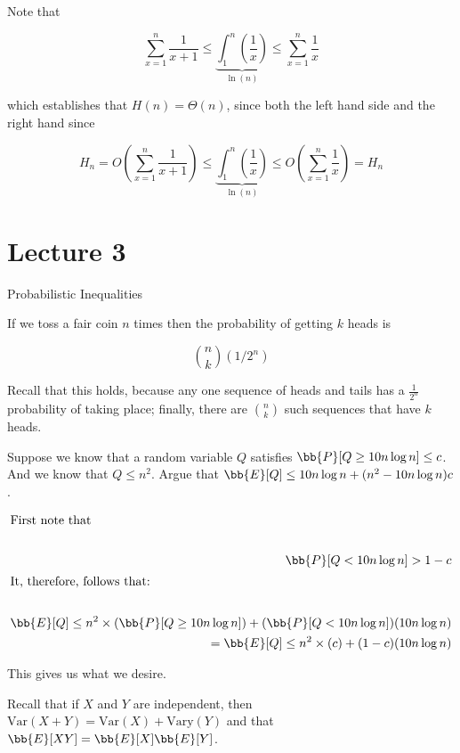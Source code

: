 \documentclass[../main.tex]{subfiles}
\begin{document}
Note that

\[
    \sum_{x=1}^{n}\frac{1}{x+1} \leq \underbrace{\int_{1}^{n}\left( \frac{1}{x} \right)}_{\ln(n)} \leq \sum_{x=1}^{n}\frac{1}{x}
\]

which establishes that $H(n) = \Theta(n)$, since both the left hand side and the right hand since


\[
    H_n = O(\sum_{x=1}^{n}\frac{1}{x+1}) \leq \underbrace{\int_{1}^{n}\left( \frac{1}{x} \right)}_{\ln(n)} \leq O(\sum_{x=1}^{n}\frac{1}{x}) = H_n
\]

\section{Lecture 3}{Probabilistic Inequalities}

\begin{remark}
    If we toss a fair coin $n$ times then the probability of getting $k$ heads is

    \[
        \binom{n}{k}(1/2^n)
    \]

    Recall that this holds, because any one sequence of heads and tails has a $\frac{1}{2^n}$
    probability of taking place; finally, there are $\binom{n}{k}$ such sequences that
    have $k$ heads.
\end{remark}

\begin{remark}
    Suppose we know that a random variable $Q$ satisfies $\bb{P}[Q \geq 10 n \log n] \leq c$. And we know that $Q \leq n^2$. Argue that $\bb{E}[Q] \leq 10 n \log n + (n^2 - 10 n \log n)c$.

    \begin{align*}
        \intertext{First note that} \\
        \bb{P}[Q < 10 n \log n] > 1 - c \\
        \intertext{It, therefore, follows that:} \\
        \bb{E}[Q] \leq n^2 \times (\bb{P}[Q \geq 10 n \log n]) + (\bb{P}[Q < 10 n \log n])(10 n \log n) \\
        = \bb{E}[Q] \leq n^2 \times (c) + (1 - c)(10 n \log n) \\
    \end{align*}

    This gives us what we desire.
\end{remark}

\begin{remark}
    Recall that if $X$ and $Y$ are independent, then $\text{Var}(X + Y) = \text{Var}(X) + \text{Vary}(Y)$ and that $\bb{E}[XY] = \bb{E}[X] \bb{E}[Y]$.
\end{remark}
\end{document}
